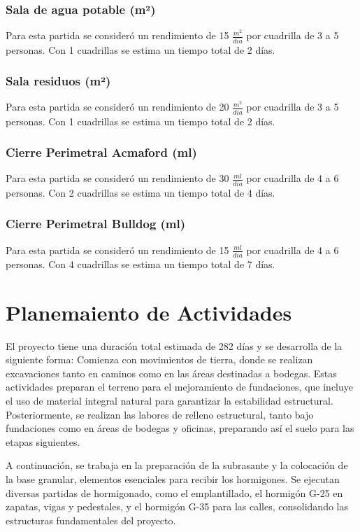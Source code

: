 \documentclass{article} %
\begin{document}
\subsubsection{Sala de agua potable (m²)}
Para esta partida se consideró un rendimiento de 15 $\frac{m^2}{dia}$ por cuadrilla de 3 a 5 personas. Con 1 cuadrillas se estima un tiempo total de 2 días.

\subsubsection{Sala residuos (m²)}
Para esta partida se consideró un rendimiento de 20 $\frac{m^2}{dia}$ por cuadrilla de 3 a 5 personas. Con 1 cuadrillas se estima un tiempo total de 2 días.

\subsubsection{Cierre Perimetral Acmaford (ml)}
Para esta partida se consideró un rendimiento de 30 $\frac{ml}{dia}$ por cuadrilla de 4 a 6 personas. Con 2 cuadrillas se estima un tiempo total de 4 días.

\subsubsection{Cierre Perimetral Bulldog (ml)}
Para esta partida se consideró un rendimiento de 15 $\frac{ml}{dia}$ por cuadrilla de 4 a 6 personas. Con 4 cuadrillas se estima un tiempo total de 7 días.

\newpage

\section{Planemaiento de Actividades}

El proyecto tiene una duración total estimada de 282 días y se desarrolla de la siguiente forma: Comienza con movimientos de tierra, donde se realizan excavaciones tanto en caminos como en las áreas destinadas a bodegas. Estas actividades preparan el terreno para el mejoramiento de fundaciones, que incluye el uso de material integral natural para garantizar la estabilidad estructural. Posteriormente, se realizan las labores de relleno estructural, tanto bajo fundaciones como en áreas de bodegas y oficinas, preparando así el suelo para las etapas siguientes.

A continuación, se trabaja en la preparación de la subrasante y la colocación de la base granular, elementos esenciales para recibir los hormigones. Se ejecutan diversas partidas de hormigonado, como el emplantillado, el hormigón G-25 en zapatas, vigas y pedestales, y el hormigón G-35 para las calles, consolidando las estructuras fundamentales del proyecto. 
\end{document}
